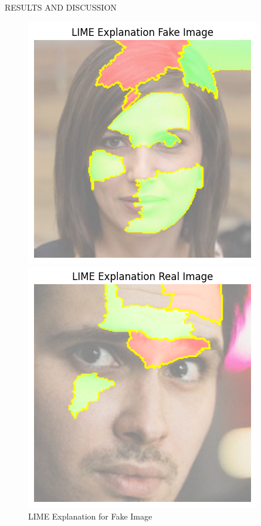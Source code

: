 \begin{section}[]{\uppercase{Results and Discussion}}
\begin{figure}[H]
    \centering
    \begin{minipage}{0.45\textwidth}
        \centering
        \includegraphics[width=\linewidth]{images/lime-fake.png}
        \captionsetup{font=small}
        \caption{LIME Explanation for Fake Image}
        \label{fig:lime-fake}
    \end{minipage}
    \hfill
    \begin{minipage}{0.45\textwidth}
        \centering
        \includegraphics[width=\linewidth]{images/lime-real.png}

\end{minipage}
\end{figure}
\end{section}
